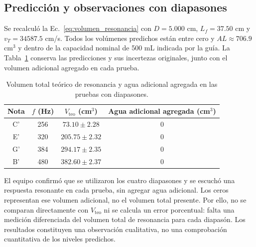\subsection{Predicción y observaciones con diapasones}
Se recalculó la Ec.~\eqref{eq:volumen_resonancia} con $D=5.000$ cm, $L_f=37.50$ cm y $v_T=34587.5$ cm/s. Todos los volúmenes predichos están entre cero y $AL\approx706.9$ cm$^3$ y dentro de la capacidad nominal de 500 mL indicada por la guía. La Tabla~\ref{tab:diapasones} conserva las predicciones y sus incertezas originales, junto con el volumen adicional agregado en cada prueba.
\begin{table}[!t]
\centering
\caption{Volumen total teórico de resonancia y agua adicional agregada en las pruebas con diapasones.}
\label{tab:diapasones}
\begin{tabular}{cccc}
\toprule
Nota & $f$ (Hz) & \shortstack{$V_{\mathrm{teo}}$\\(cm$^3$)} & \shortstack{Agua adicional\\agregada (cm$^3$)}\\
\midrule
C' & 256 & $73.10\pm2.28$ & 0\\
E' & 320 & $205.75\pm2.32$ & 0\\
G' & 384 & $294.17\pm2.35$ & 0\\
B' & 480 & $382.60\pm2.37$ & 0\\
\bottomrule
\end{tabular}
\end{table}
El equipo confirmó que se utilizaron los cuatro diapasones y se escuchó una respuesta resonante en cada prueba, sin agregar agua adicional. Los ceros representan ese volumen adicional, no el volumen total presente. Por ello, no se comparan directamente con $V_{\mathrm{teo}}$ ni se calcula un error porcentual: falta una medición diferenciada del volumen total de resonancia para cada diapasón. Los resultados constituyen una observación cualitativa, no una comprobación cuantitativa de los niveles predichos.
